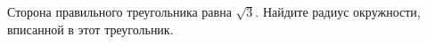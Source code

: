 \begin{ex}
	\begin{condition}
		Сторона правильного треугольника равна \( \sqrt{3} \). Найдите радиус окружности, вписанной в этот треугольник.
	\end{condition}
\end{ex}